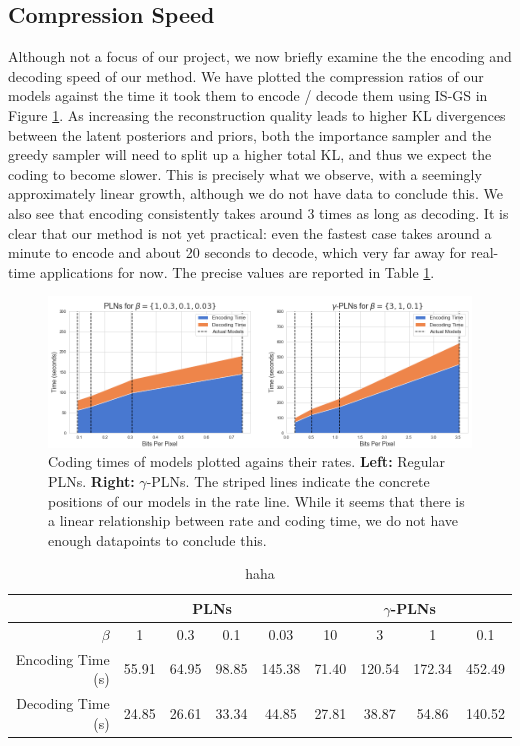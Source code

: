 \documentclass{article}
\begin{document}
\subsection{Compression Speed}
\par
Although not a focus of our project, we now briefly examine the the encoding and
decoding speed of our method. We have plotted the compression ratios of our
models against the time it took them to encode / decode them using IS-GS in
Figure \ref{fig:kodim01_coding_time}. As increasing the reconstruction quality
leads to higher KL divergences between the latent posteriors and priors, both the
importance sampler and the greedy sampler will need to split up a higher total
KL, and thus we expect the coding to become slower. This is precisely what we
observe, with a seemingly approximately linear growth, although we do not have
data to conclude this. We also see that encoding consistently takes around 3
times as long as decoding. It is clear that our method is not yet practical:
even the fastest case takes around a minute to encode and about 20 seconds to
decode, which very far away for real-time applications for now. The precise
values are reported in Table \ref{tab:kodim01_coding_time}.
\begin{figure}
  \centering
  \includegraphics[width=\textwidth]{../img/plots/kodak_coding_time/kodim01_coding_time}
  \caption{Coding times of models plotted agains their rates. \textbf{Left:}
    Regular PLNs. \textbf{Right:} $\gamma$-PLNs. The striped lines indicate
    the concrete positions of our models in the rate line. While it seems
    that there is a
    linear relationship between rate and coding time, we do not have enough
    datapoints to conclude this.}
  \label{fig:kodim01_coding_time}
\end{figure}

\begin{table}[]
  \centering
  \begin{tabular}{|r||c|c|c|c||c|c|c|c|}
    \hline
    & \multicolumn{4}{c||}{\textbf{PLNs}} & \multicolumn{4}{c|}{\textbf{$\gamma$-PLNs}} \\
    \hline 
    $\beta$ & 1 & 0.3 & 0.1 & 0.03 & 10 & 3 & 1 & 0.1 \\ 
    \hline\hline
    Encoding Time (s) & 55.91 & 64.95 & 98.85 & 145.38 & 71.40 & 120.54 & 172.34 & 452.49 \\
    \hline
    Decoding Time (s) & 24.85 & 26.61 & 33.34 & 44.85 & 27.81 & 38.87 & 54.86 & 140.52 \\
    \hline
  \end{tabular}
  \caption{haha}
  \label{tab:kodim01_coding_time}
\end{table}
\end{document}
